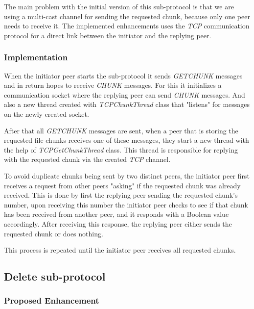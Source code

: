 \documentclass[a4paper]{article}
\begin{document}
            The main problem with the initial version of this sub-protocol is that we are using a multi-cast channel for sending the requested chunk, because only one peer needs to receive it. The implemented enhancements uses the \textit{TCP} communication protocol for a direct link between the initiator and the replying peer.
        
        \subsubsection{Implementation}
        
            When the initiator peer starts the sub-protocol it sends \textit{GETCHUNK} messages and in return hopes to receive \textit{CHUNK} messages. For this it initializes a communication socket where the replying peer can send \textit{CHUNK} messages. And also a new thread created with \textit{TCPChunkThread} class that "listens" for messages on the newly created socket.

            After that all \textit{GETCHUNK} messages are sent, when a peer that is storing the requested file chunks receives one of these messages, they start a new thread with the help of \textit{TCPGetChunkThread} class. This thread is responsible for replying with the requested chunk via the created \textit{TCP} channel.
            
            To avoid duplicate chunks being sent by two distinct peers, the initiator peer first receives a request from other peers "asking" if the requested chunk was already received. This is done by first the replying peer sending the requested chunk's number, upon receiving this number the initiator peer checks to see if that chunk has been received from another peer, and it responds with a Boolean value accordingly. After receiving this response, the replying peer either sends the requested chunk or does nothing.
            
            This process is repeated until the initiator peer receives all requested chunks.
    
    \subsection{Delete sub-protocol}
    
        \subsubsection{Proposed Enhancement}
\end{document}
